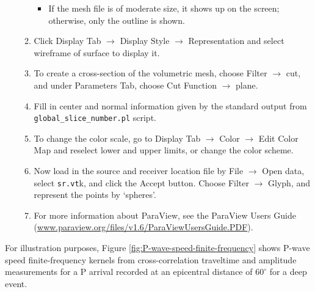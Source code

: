 \documentclass[oneside,english]{book}
\newcommand{\urlwithparentheses}[1]{(\url{#1})}
\begin{document}
\begin{enumerate}
\begin{enumerate}
\begin{itemize}
\item If the mesh file is of moderate size, it shows up on the screen; otherwise,
only the outline is shown.
\end{itemize}
\item Click \textsf{Display Tab} $\rightarrow$ \textsf{Display Style} $\rightarrow$
\textsf{Representation} and select \textsf{wireframe of surface} to
display it.
\item To create a cross-section of the volumetric mesh, choose \textsf{Filter}
$\rightarrow$ \textsf{cut}, and under \textsf{Parameters Tab}, choose
\textsf{Cut Function} $\rightarrow$ \textsf{plane}.
\item Fill in center and normal information given by the standard output
from \texttt{global\_slice\_number.pl} script.
\item To change the color scale, go to \textsf{Display Tab} $\rightarrow$
\textsf{Color} $\rightarrow$ \textsf{Edit Color Map} and reselect
lower and upper limits, or change the color scheme.
\item Now load in the source and receiver location file by \textsf{File}
$\rightarrow$\textsf{ Open data}, select \texttt{sr.vt}k, and click
the \textsf{Accept} button. Choose \textsf{Filter} $\rightarrow$\textsf{
Glyph}, and represent the points by `\textsf{spheres}'.
\item For more information about ParaView, see the ParaView Users Guide \urlwithparentheses{www.paraview.org/files/v1.6/ParaViewUsersGuide.PDF}.
\end{enumerate}
\end{enumerate}
For illustration purposes, Figure \ref{fig:P-wave-speed-finite-frequency}
shows P-wave speed finite-frequency kernels from cross-correlation traveltime and amplitude measurements for a P arrival recorded at an epicentral distance of $60^{\circ}$ for a deep event.
\end{document}
